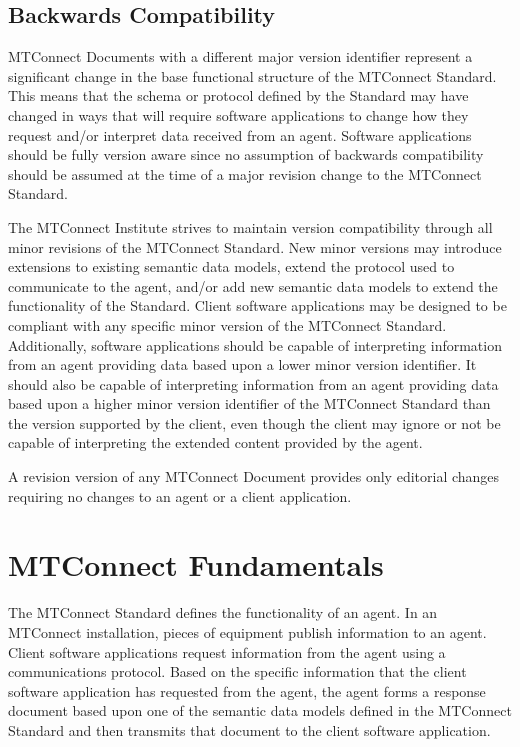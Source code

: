 
\subsection{Backwards Compatibility}
\label{sec:Backwards Compatibility}

MTConnect Documents with a different \gls{major} version identifier represent a significant change in the \gls{base functional structure} of the MTConnect Standard.  This means that the schema or protocol defined by the Standard may have changed in ways that will require software applications to change how they request and/or interpret data received from an \gls{agent}.  Software applications should be fully version aware since no assumption of backwards compatibility should be assumed at the time of a \gls{major} revision change to the MTConnect Standard.

The MTConnect Institute strives to maintain version compatibility through all \gls{minor} revisions of the MTConnect Standard.  New \gls{minor} versions may introduce extensions to existing \glspl{semantic data model}, extend the protocol used to communicate to the \gls{agent}, and/or add new \glspl{semantic data model} to extend the functionality of the Standard.  Client software applications may be designed to be compliant with any specific \gls{minor} version of the MTConnect Standard.  Additionally, software applications should be capable of interpreting information from an \gls{agent} providing data based upon a lower \gls{minor} version identifier.  It should also be capable of interpreting information from an \gls{agent} providing data based upon a higher \gls{minor} version identifier of the MTConnect Standard than the version supported by the client, even though the client may ignore or not be capable of interpreting the extended content provided by the \gls{agent}.

A \gls{revision} version of any MTConnect Document provides only editorial changes requiring no changes to an \gls{agent} or a client application.

\section{MTConnect Fundamentals}

The MTConnect Standard defines the functionality of an \gls{agent}.  In an MTConnect installation, pieces of equipment publish information to an \gls{agent}.  Client software applications request information from the \gls{agent} using a communications protocol.  Based on the specific information that the client software application has requested from the \gls{agent}, the \gls{agent} forms a \gls{response document} based upon one of the \glspl{semantic data model} defined in the MTConnect Standard and then transmits that document to the client software application.  

